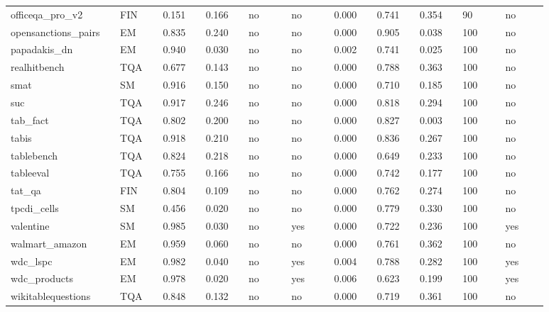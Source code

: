 \begin{landscape}
\begin{longtable}{p{0.147\linewidth}p{0.073\linewidth}p{0.073\linewidth}p{0.073\linewidth}p{0.073\linewidth}p{0.073\linewidth}p{0.073\linewidth}p{0.073\linewidth}p{0.073\linewidth}p{0.073\linewidth}p{0.073\linewidth}}
officeqa\_\allowbreak{}pro\_\allowbreak{}v2 & FIN & 0.151 & 0.166 & no & no & 0.000 & 0.741 & 0.354 & 90 & no \\
opensanctions\_\allowbreak{}pairs & EM & 0.835 & 0.240 & no & no & 0.000 & 0.905 & 0.038 & 100 & no \\
papadakis\_\allowbreak{}dn & EM & 0.940 & 0.030 & no & no & 0.002 & 0.741 & 0.025 & 100 & no \\
realhitbench & TQA & 0.677 & 0.143 & no & no & 0.000 & 0.788 & 0.363 & 100 & no \\
smat & SM & 0.916 & 0.150 & no & no & 0.000 & 0.710 & 0.185 & 100 & no \\
suc & TQA & 0.917 & 0.246 & no & no & 0.000 & 0.818 & 0.294 & 100 & no \\
tab\_\allowbreak{}fact & TQA & 0.802 & 0.200 & no & no & 0.000 & 0.827 & 0.003 & 100 & no \\
tabis & TQA & 0.918 & 0.210 & no & no & 0.000 & 0.836 & 0.267 & 100 & no \\
tablebench & TQA & 0.824 & 0.218 & no & no & 0.000 & 0.649 & 0.233 & 100 & no \\
tableeval & TQA & 0.755 & 0.166 & no & no & 0.000 & 0.742 & 0.177 & 100 & no \\
tat\_\allowbreak{}qa & FIN & 0.804 & 0.109 & no & no & 0.000 & 0.762 & 0.274 & 100 & no \\
tpcdi\_\allowbreak{}cells & SM & 0.456 & 0.020 & no & no & 0.000 & 0.779 & 0.330 & 100 & no \\
valentine & SM & 0.985 & 0.030 & no & yes & 0.000 & 0.722 & 0.236 & 100 & yes \\
walmart\_\allowbreak{}amazon & EM & 0.959 & 0.060 & no & no & 0.000 & 0.761 & 0.362 & 100 & no \\
wdc\_\allowbreak{}lspc & EM & 0.982 & 0.040 & no & yes & 0.004 & 0.788 & 0.282 & 100 & yes \\
wdc\_\allowbreak{}products & EM & 0.978 & 0.020 & no & yes & 0.006 & 0.623 & 0.199 & 100 & yes \\
wikitablequestions & TQA & 0.848 & 0.132 & no & no & 0.000 & 0.719 & 0.361 & 100 & no \\
\bottomrule
\end{longtable}
\normalsize
\end{landscape}

